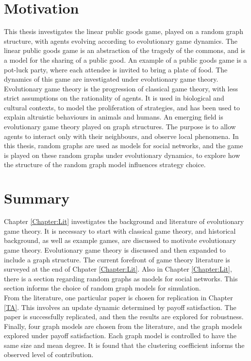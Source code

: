 \section{Motivation}
This thesis investigates the linear public goods game, played on a random graph structure, with agents evolving according to evolutionary game dynamics. The linear public goods game is an abstraction of the tragedy of the commons, and is a model for the sharing of a public good. An example of a public goods game is a pot-luck party, where each attendee is invited to bring a plate of food. The dynamics of this game are investigated under evolutionary game theory. Evolutionary game theory is the progression of classical game theory, with less strict assumptions on the rationality of agents. It is used in biological and cultural contexts, to model the proliferation of strategies, and has been used to explain altruistic behaviours in animals and humans. An emerging field is evolutionary game theory played on graph structures. The purpose is to allow agents to interact only with their neighbours, and observe local phenomena. In this thesis, random graphs are used as models for social networks, and the game is played on these random graphs under evolutionary dynamics, to explore how the structure of the random graph model influences strategy choice. 

\section{Summary}

Chapter \ref{Chapter:Lit} investigates the background and literature of evolutionary game theory. It is necessary to start with classical game theory, and historical background, as well as example games, are discussed to motivate evolutionary game theory. Evolutionary game theory is discussed and then expanded to include a graph structure. The current forefront of game theory literature is surveyed at the end of Chpater \ref{Chapter:Lit}. Also in Chapter \ref{Chapter:Lit}, there is a section regarding random graphs as models for social networks. This section informs the choice of random graph models for simulation. \\

From the literature, one particular paper is chosen for replication in Chapter \ref{TA}. This involves an update dynamic determined by payoff satisfaction. The paper is successfully replicated, and then the results are explored for robustness. Finally, four graph models are chosen from the literature, and the graph models explored under payoff satisfaction. Each graph model is controlled to have the same size and mean degree. It is found that the clustering coefficient informs the observed level of contribution. \\

